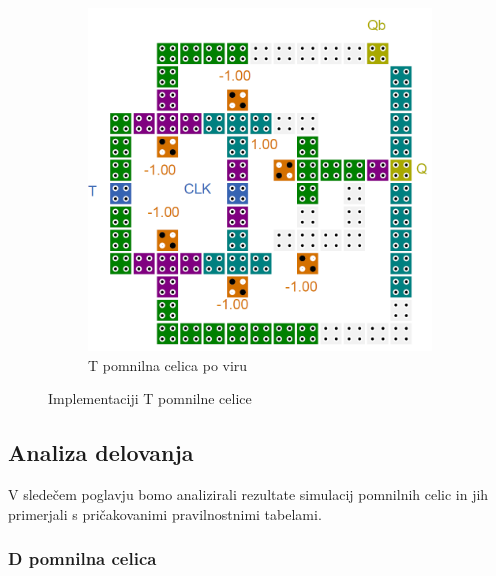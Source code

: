 \documentclass[a4paper, 11pt]{article}
\begin{document}
\begin{figure}[h!]
\begin{subfigure}[b]{0.4\textwidth}
	\includegraphics[width=\textwidth]{../img/vir_5/t.png} 
	\caption{T pomnilna celica po viru \cite{a_novel_approach}}
	\label{fig-t-2}
	\end{subfigure}
	\caption{Implementaciji T pomnilne celice}
	\label{fig-t}
\end{figure}


\subsection{Analiza delovanja}
V sledečem poglavju bomo analizirali rezultate simulacij pomnilnih celic in jih primerjali s pričakovanimi pravilnostnimi tabelami.

\subsubsection{D pomnilna celica}
\end{document}
